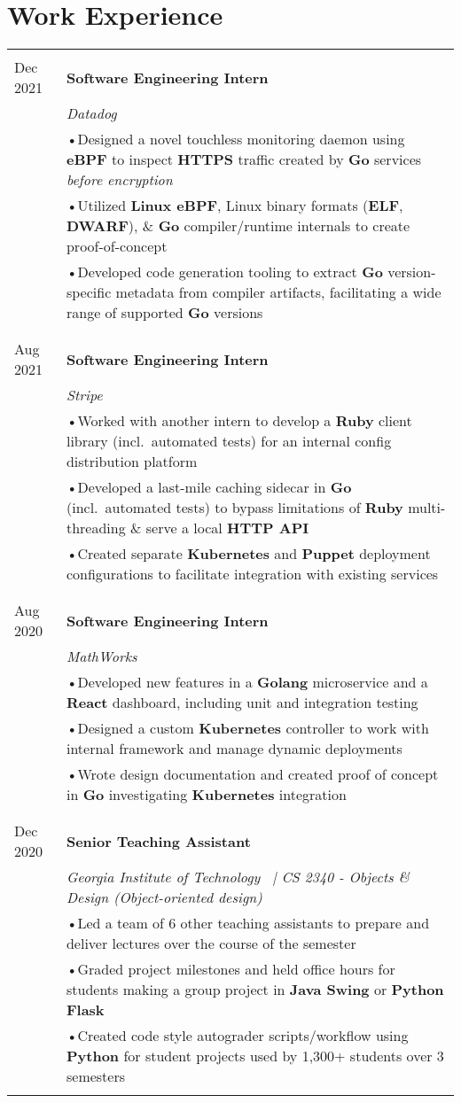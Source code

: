\documentclass[a4paper,11pt]{article}
\newcommand{\lcolwidth}{2.2cm}
\newcommand{\lcolwidthinner}{2.1cm}
\newcommand{\rcolwidth}{16.2cm}
\newenvironment{rsection}[1]
  {
    \section{#1}
    \begin{tabular}{>{\raggedleft\arraybackslash}p{\lcolwidth}|p{\rcolwidth}}
   } {
    \\\multicolumn{2}{c}{} \\[-10pt]
    \end{tabular}
  }
\newcommand{\rheader}[2]{
    \multirow[t]{2}{*}{
        \begin{minipage}[t]{\lcolwidthinner}
            \begin{flushright}
                \textsc{#1}
            \end{flushright}
        \end{minipage}
    } & \textbf{#2}
}
\newcommand{\rdesc}[1]{
  \\[-2pt]&\small{\emph{#1}\vspace{1pt} }
}
\newcommand{\ritem}[2][ •\hspace{3pt}]{\\[-2pt]& \footnotesize{#1#2}}
\newcommand{\rskip}{\\\multicolumn{2}{c}{} \\[-5pt]}
\begin{document}
\begin{rsection}{Work Experience}
  \rheader{Aug 2021 -\\[-1pt] Dec 2021}{Software Engineering Intern}
  \rdesc{Datadog}
  \ritem{Designed a novel touchless monitoring daemon using \textbf{eBPF}
    to inspect \textbf{HTTPS} traffic created by \textbf{Go} services \textit{before encryption}}
  \ritem{Utilized \textbf{Linux eBPF}, Linux binary formats (\textbf{ELF}, \textbf{DWARF}),
    \& \textbf{Go} compiler/runtime internals to create proof-of-concept}
  \ritem{Developed code generation tooling to extract \textbf{Go} version-specific
    metadata from compiler artifacts, facilitating a wide range of supported \textbf{Go} versions}
  \rskip

  \rheader{May 2021 -\\[-1pt] Aug 2021}{Software Engineering Intern}
  \rdesc{Stripe}
  \ritem{Worked with another intern to develop a \textbf{Ruby} client library (incl.\ automated tests)
    for an internal config distribution platform}
  \ritem{Developed a last-mile caching sidecar in \textbf{Go} (incl.\ automated tests) to
    bypass limitations of \textbf{Ruby} multi-threading \& serve a local \textbf{HTTP API}}
  \ritem{Created separate \textbf{Kubernetes} and \textbf{Puppet} deployment
    configurations to facilitate integration with existing services}
  \rskip

  \rheader{May 2020 -\\[-1pt] Aug 2020}{Software Engineering Intern}
  \rdesc{MathWorks}
  \ritem{Developed new features in a \textbf{Golang} microservice
    and a \textbf{React} dashboard, including unit and integration testing}
  \ritem{Designed a custom \textbf{Kubernetes} controller
    to work with internal framework and manage dynamic deployments}
  \ritem{Wrote design documentation and created proof of concept
    in \textbf{Go} investigating \textbf{Kubernetes} integration}
  \rskip

  \rheader{Aug 2019 -\\[-1pt] Dec 2020}{Senior Teaching Assistant}
  \rdesc{Georgia Institute of Technology \ {\normalfont |}\hspace{2pt}
    CS 2340 - Objects \& Design (Object-oriented design)}
  \ritem{Led a team of 6 other teaching assistants to prepare and deliver lectures
    over the course of the semester}
  \ritem{Graded project milestones and held office hours for students
    making a group project in \textbf{Java Swing} or \textbf{Python Flask}}
  \ritem{Created code style autograder scripts/workflow using \textbf{Python}
    for student projects used by 1,300+ students over 3 semesters}
\end{rsection}
\vspace{-3pt}
\end{document}
